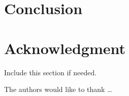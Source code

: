 \documentclass[11pt,journal]{IEEEtran}
\begin{document}


% 


\section{Conclusion}



\section*{Acknowledgment}

Include this section if needed.

The authors would like to thank \ldots




\end{document}
